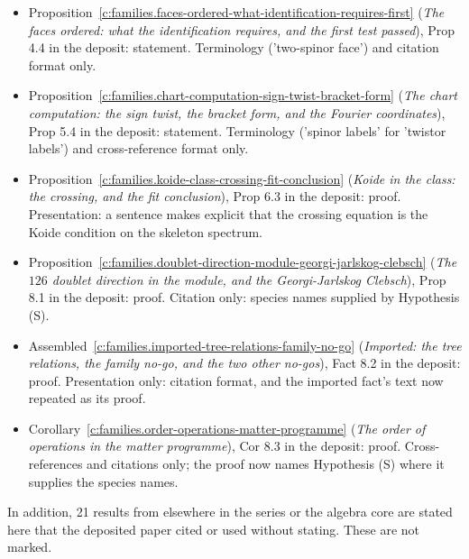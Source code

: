 \documentclass[11pt]{article}
\theoremstyle{definition}
\theoremstyle{plain}
\begin{document}
\begin{itemize}
\item Proposition~\ref{c:families.faces-ordered-what-identification-requires-first} (\emph{The faces ordered: what the identification requires, and the first test passed}), Prop 4.4 in the deposit: statement. Terminology ('two-spinor face') and citation format only.
\item Proposition~\ref{c:families.chart-computation-sign-twist-bracket-form} (\emph{The chart computation: the sign twist, the bracket form, and the Fourier coordinates}), Prop 5.4 in the deposit: statement. Terminology ('spinor labels' for 'twistor labels') and cross-reference format only.
\item Proposition~\ref{c:families.koide-class-crossing-fit-conclusion} (\emph{Koide in the class: the crossing, and the fit conclusion}), Prop 6.3 in the deposit: proof. Presentation: a sentence makes explicit that the crossing equation is the Koide condition on the skeleton spectrum.
\item Proposition~\ref{c:families.doublet-direction-module-georgi-jarlskog-clebsch} (\emph{The $126$ doublet direction in the module, and the Georgi-Jarlskog Clebsch}), Prop 8.1 in the deposit: proof. Citation only: species names supplied by Hypothesis (S).
\item Assembled~\ref{c:families.imported-tree-relations-family-no-go} (\emph{Imported: the tree relations, the family no-go, and the two other no-gos}), Fact 8.2 in the deposit: proof. Presentation only: citation format, and the imported fact's text now repeated as its proof.
\item Corollary~\ref{c:families.order-operations-matter-programme} (\emph{The order of operations in the matter programme}), Cor 8.3 in the deposit: proof. Cross-references and citations only; the proof now names Hypothesis (S) where it supplies the species names.
\end{itemize}
\noindent In addition, 21 results from elsewhere in the series or the algebra core are stated here that the deposited paper cited or used without stating. These are not marked.
\end{document}
